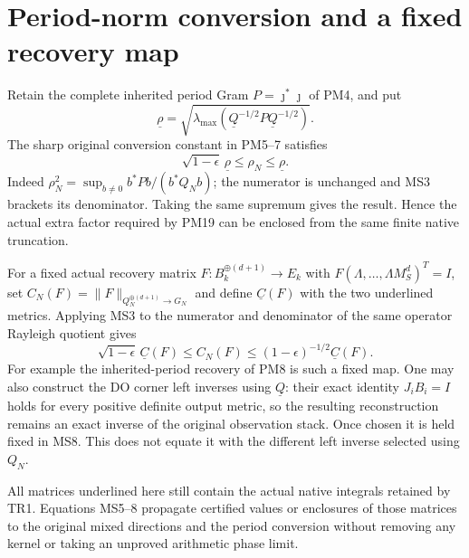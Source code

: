 \documentclass[11pt]{article}
\begin{document}
\section{Period-norm conversion and a fixed recovery map}
Retain the complete inherited period Gram $P=\jmath^*\jmath$ of
PM4, and put
\[
 \underline\rho=\sqrt{\lambda_{\max}
          (\underline Q^{-1/2}P\underline Q^{-1/2})}.
\]
The sharp original conversion constant in PM5--7 satisfies
\[
 \boxed{\sqrt{1-\epsilon}\,\underline\rho
      \le\rho_N\le\underline\rho.}\tag{MS7}
\]
Indeed $\rho_N^2=\sup_{b\ne0}b^*Pb/(b^*Q_Nb)$; the numerator
is unchanged and MS3 brackets its denominator. Taking the same
supremum gives the result. Hence the actual extra factor required
by PM19 can be enclosed from the same finite native truncation.

For a fixed actual recovery matrix $F:B_k^{\oplus(d+1)}\to E_k$
with $F(\Lambda,\ldots,\Lambda M_S^d)^T=I$, set
$C_N(F)=\|F\|_{Q_N^{\oplus(d+1)}\to G_N}$ and define
$\underline C(F)$ with the two underlined metrics. Applying MS3
to the numerator and denominator of the same operator Rayleigh
quotient gives
\[
 \sqrt{1-\epsilon}\,\underline C(F)
 \le C_N(F)\le(1-\epsilon)^{-1/2}\underline C(F).
 \tag{MS8}
\]
For example the inherited-period recovery of PM8 is such a fixed
map. One may also construct the DO corner left inverses using
$\underline Q$: their exact identity $J_iB_i=I$ holds for every
positive definite output metric, so the resulting reconstruction
remains an exact inverse of the original observation stack.
Once chosen it is held fixed in MS8. This does not equate it
with the different left inverse selected using $Q_N$.

All matrices underlined here still contain the actual native
integrals retained by TR1. Equations MS5--8 propagate certified
values or enclosures of those matrices to the original mixed
directions and the period conversion without removing any kernel
or taking an unproved arithmetic phase limit.
\end{document}
